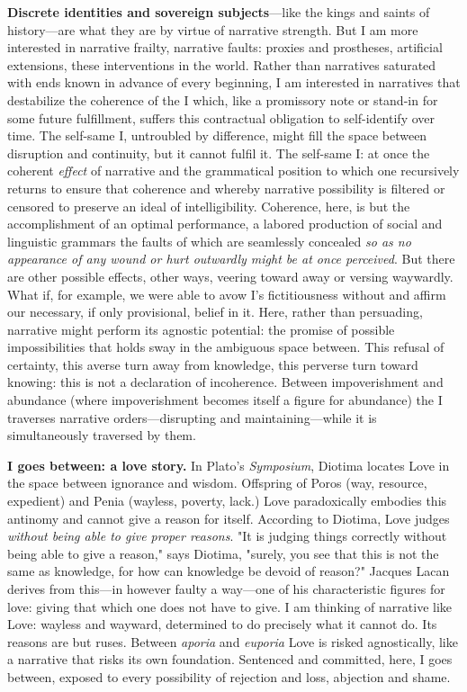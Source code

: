 \textbf{Discrete identities and sovereign subjects}---like the kings and
saints of history---are what they are by virtue of narrative strength.
But I am more interested in narrative frailty, narrative faults: proxies
and prostheses, artificial extensions, these interventions in the world.
Rather than narratives saturated with ends known in advance of every
beginning, I am interested in narratives that destabilize the coherence
of the I which, like a promissory note or stand-in for some future
fulfillment, suffers this contractual obligation to self-identify over
time. The self-same I, untroubled by difference, might fill the space
between disruption and continuity, but it cannot fulfil it. The
self-same I: at once the coherent \emph{effect} of narrative and the
grammatical position to which one recursively returns to ensure that
coherence and whereby narrative possibility is filtered or censored to
preserve an ideal of intelligibility. Coherence, here, is but the
accomplishment of an optimal performance, a labored production of social
and linguistic grammars the faults of which are seamlessly concealed
\emph{so as no appearance of any wound or hurt outwardly might be at
once perceived}. But there are other possible effects, other ways,
veering toward away or versing waywardly. What if, for example, we were
able to avow I's fictitiousness without and affirm our necessary, if
only provisional, belief in it. Here, rather than persuading, narrative
might perform its agnostic potential: the promise of possible
impossibilities that holds sway in the ambiguous space between. This
refusal of certainty, this averse turn away from knowledge, this
perverse turn toward knowing: this is not a declaration of incoherence.
Between impoverishment and abundance (where impoverishment becomes
itself a figure for abundance) the I traverses narrative
orders---disrupting and maintaining---while it is simultaneously
traversed by them.

\textbf{I goes between: a love story.} In Plato's \emph{Symposium},
Diotima locates Love in the space between ignorance and wisdom.
Offspring of Poros (way, resource, expedient) and Penia (wayless,
poverty, lack.) Love paradoxically embodies this antinomy and cannot
give a reason for itself. According to Diotima, Love judges
\emph{without being able to give proper reasons}. "It is judging things
correctly without being able to give a reason," says Diotima, "surely,
you see that this is not the same as knowledge, for how can knowledge be
devoid of reason?" Jacques Lacan derives from this---in however faulty a
way---one of his characteristic figures for love: giving that which one
does not have to give. I am thinking of narrative like Love: wayless and
wayward, determined to do precisely what it cannot do. Its reasons are
but ruses. Between \emph{aporia} and \emph{euporia} Love is risked
agnostically, like a narrative that risks its own foundation. Sentenced
and committed, here, I goes between, exposed to every possibility of
rejection and loss, abjection and shame.

